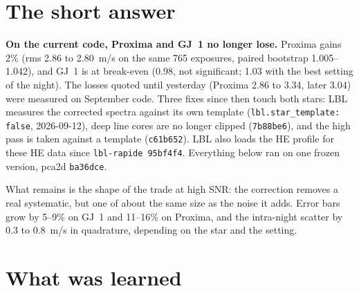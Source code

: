 \section*{The short answer}

\textbf{On the current code, Proxima and GJ~1 no longer lose.} Proxima gains
2\%{} (rms 2.86 to 2.80~m/s on the same 765 exposures, paired bootstrap
1.005--1.042), and GJ~1 is at break-even (0.98, not significant; 1.03 with the
best setting of the night). The losses quoted until yesterday (Proxima 2.86 to
3.34, later 3.04) were measured on September code. Three fixes since then
touch both stars: LBL measures the corrected spectra against its own template
(\texttt{lbl.star\_template: false}, 2026-09-12), deep line cores are no
longer clipped (\texttt{7b88be6}), and the high pass is taken against a
template (\texttt{c61b652}). LBL also loads the HE profile for these HE data
since \texttt{lbl-rapide 95bf4f4}. Everything below ran on one frozen
version, pca2d \texttt{ba36dce}.

What remains is the shape of the trade at high SNR: the correction removes a
real systematic, but one of about the same size as the noise it adds. Error
bars grow by 5--9\%{} on GJ~1 and 11--16\%{} on Proxima, and the intra-night
scatter by 0.3 to 0.8~m/s in quadrature, depending on the star and the
setting.

\section*{What was learned}

